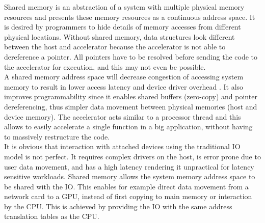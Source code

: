 
Shared memory is an abstraction of a system with multiple physical memory resources and presents these memory resources as a continuous address space. It is desired by programmers to hide details of memory accesses from different physical locations. Without shared memory, data structures look different between the host and accelerator because the accelerator is not able to dereference a pointer. All pointers have to be resolved before sending the code to the accelerator for execution, and this may not even be possible.\\
A shared memory address space will decrease congestion of accessing system memory to result in lower access latency and device driver overhead \cite{capi-cantle}. It also improves programmability since it enables shared buffers (zero-copy) and pointer dereferencing, thus simpler data movement between physical memories (host and device memory). The accelerator acts similar to a processor thread and this allows to easily accelerate a single function in a big application, without having to massively restructure the code.\\
It is obvious that interaction with attached devices using the traditional IO model is not perfect. It requires complex drivers on the host, is error prone due to user data movement, and has a high latency rendering it unpractical for latency sensitive workloads. Shared memory allows the system memory address space to be shared with the IO. This enables for example direct data movement from a network card to a GPU, instead of first copying to main memory or interaction by the CPU. This is achieved by providing the IO with the same address translation tables as the CPU.




